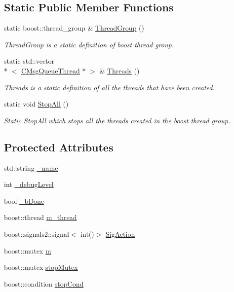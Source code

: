 \subsection*{Static Public Member Functions}
\begin{DoxyCompactItemize}
\item 
static boost\-::thread\-\_\-group \& \hyperlink{classRCS_1_1CMsgQueueThread_ac70bf2b33ea7f6d3fd2e72206c080a75}{Thread\-Group} ()
\begin{DoxyCompactList}\small\item\em Thread\-Group is a static definition of boost thread group. \end{DoxyCompactList}\item 
static std\-::vector\\*
$<$ \hyperlink{classRCS_1_1CMsgQueueThread}{C\-Msg\-Queue\-Thread} $\ast$ $>$ \& \hyperlink{classRCS_1_1CMsgQueueThread_a8d9a466ec9df7101c94af23ccaaf5727}{Threads} ()
\begin{DoxyCompactList}\small\item\em Threads is a static definition of all the threads that have been created. \end{DoxyCompactList}\item 
static void \hyperlink{classRCS_1_1CMsgQueueThread_a965133948e3f8580b318ed69a5639937}{Stop\-All} ()
\begin{DoxyCompactList}\small\item\em Static Stop\-All which stops all the threads created in the boost thread group. \end{DoxyCompactList}\end{DoxyCompactItemize}
\subsection*{Protected Attributes}
\begin{DoxyCompactItemize}
\item 
std\-::string \hyperlink{classRCS_1_1CMsgQueueThread_a73e8b77421902303337324d84db7d35e}{\-\_\-name}
\item 
int \hyperlink{classRCS_1_1CMsgQueueThread_af5f49a26ae621445fb7034f9f22eee9e}{\-\_\-debug\-Level}
\item 
bool \hyperlink{classRCS_1_1CMsgQueueThread_abaca84c63f4938c14feb681aaa3065fa}{\-\_\-b\-Done}
\item 
boost\-::thread \hyperlink{classRCS_1_1CMsgQueueThread_afe3a75cabe791747c8d1464014e1f798}{m\-\_\-thread}
\item 
boost\-::signals2\-::signal$<$ int()$>$ \hyperlink{classRCS_1_1CMsgQueueThread_ad4d34f744d23222ec66655fbcb6a2580}{Sig\-Action}
\item 
boost\-::mutex \hyperlink{classRCS_1_1CMsgQueueThread_a238d69660145a0aaaf44822073c353bf}{m}
\item 
boost\-::mutex \hyperlink{classRCS_1_1CMsgQueueThread_a45804784a5293cc44bec276842b8eb0a}{stop\-Mutex}
\item 
boost\-::condition \hyperlink{classRCS_1_1CMsgQueueThread_a2d89255c589626cc327ea0f87e2d03f8}{stop\-Cond}
\end{DoxyCompactItemize}
